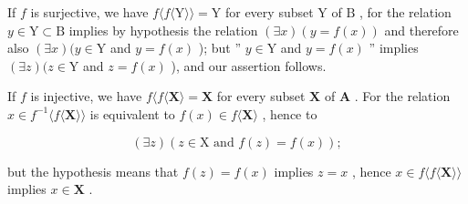 If \(f\) is surjective, we have \(f\langle f\langle \mathrm{Y}\rangle\rangle = \mathrm{Y}\) for every subset \(\mathrm{Y}\) of \(\mathrm{B}\) , for the relation \(y\in \mathrm{Y}\subset \mathrm{B}\) implies by hypothesis the relation \((\exists x)(y = f(x))\) and therefore also \((\exists x)(y\in \mathrm{Y}\) and \(y = f(x)\) ); but '' \(y\in \mathrm{Y}\) and \(y = f(x)\) '' implies \((\exists z)(z\in \mathrm{Y}\) and \(z = f(x)\) ), and our assertion follows.

If \(f\) is injective, we have \(f\langle f\langle \mathbf{X}\rangle = \mathbf{X}\) for every subset \(\mathbf{X}\) of \(\mathbf{A}\) . For the relation \(x\in f^{-1}\langle f\langle \mathbf{X}\rangle\rangle\) is equivalent to \(f(x)\in f\langle \mathbf{X}\rangle\) , hence to

\[
(\exists z) (z \in \mathrm{X} \text {   and   } f (z) = f (x));
\]

but the hypothesis means that \(f(z) = f(x)\) implies \(z = x\) , hence \(x \in f\langle f\langle \mathbf{X}\rangle \rangle\) implies \(x \in \mathbf{X}\) .

